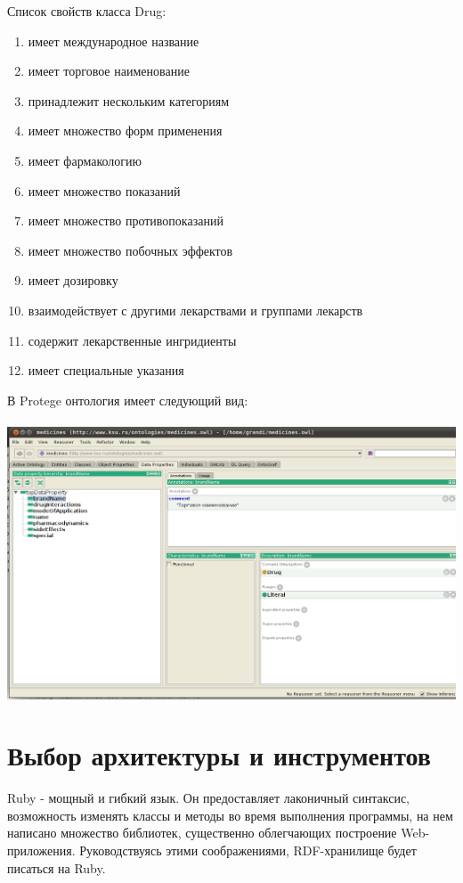 \documentclass[specialist,subf,href,colorlinks=true
]{disser}
\begin{document}
Список свойств класса Drug:
\begin{enumerate}
 \item имеет международное название
 \item имеет торговое наименование
 \item принадлежит нескольким категориям
 \item имеет множество форм применения
 \item имеет фармакологию
 \item имеет множество показаний
 \item имеет множество противопоказаний
 \item имеет множество побочных эффектов
 \item имеет дозировку
 \item взаимодействует с другими лекарствами и группами лекарств
 \item содержит лекарственные ингридиенты
 \item имеет специальные указания
\end{enumerate}
В Protege онтология имеет следующий вид:
\\ 
\\ \includegraphics[width=160mm]{2.png}

\section{Выбор архитектуры и инструментов}

Ruby - мощный и гибкий язык. \cite{rubylang} Он предоставляет лаконичный синтаксис, возможность изменять классы и методы во время выполнения программы, на нем написано множество библиотек, существенно облегчающих построение Web-приложения. Руководствуясь этими соображениями, RDF-хранилище будет писаться на Ruby.
\end{document}
